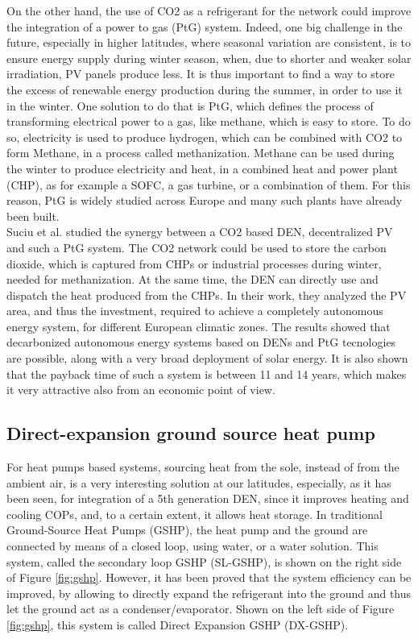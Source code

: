 \documentclass{article}
\begin{document}
On the other hand, the use of CO2 as a refrigerant for the network could improve the integration of a power to gas (PtG) system. Indeed, one big challenge in the future, especially in higher latitudes, where seasonal variation are consistent, is to ensure energy supply during winter season, when, due to shorter and weaker solar irradiation, PV panels produce less. It is thus important to find a way to store the excess of renewable energy production during the summer, in order to use it in the winter.
One solution to do that is PtG, which defines the process of transforming electrical power to a gas, like methane, which is easy to store. To do so, electricity is used to produce hydrogen, which can be combined with CO2 to form Methane, in a process called methanization. Methane can be used during the winter to produce electricity and heat, in a combined heat and power plant (CHP), as for example a SOFC, a gas turbine, or a combination of them. For this reason, PtG is widely studied across Europe and many such plants have already been built.\\ 
Suciu et al. \cite{suciuEnergyIntegrationCO22018} studied the synergy between a CO2 based DEN, decentralized PV and such a PtG system. The CO2 network could be used to store the carbon dioxide, which is captured from CHPs or industrial processes during winter, needed for methanization. At the same time, the DEN can directly use and dispatch the heat produced from the CHPs. In their work, they analyzed the PV area, and thus the investment, required to achieve a completely autonomous energy system, for different European climatic zones. The results showed that decarbonized autonomous energy systems based on DENs and PtG tecnologies are possible, along with a very broad deployment of solar energy. It is also shown that the payback time of such a system is between 11 and 14 years, which makes it very attractive also from an economic point of view.

\subsection{Direct-expansion ground source heat pump}\label{ss:dx}

For heat pumps based systems, sourcing heat from the sole, instead of from the ambient air, is a very interesting solution at our latitudes, especially, as it has been seen, for integration of a 5th generation DEN, since it improves heating and cooling COPs, and, to a certain extent, it allows heat storage. In traditional Ground-Source Heat Pumps (GSHP), the heat pump and the ground are connected by means of a closed loop, using water, or a water solution. This system, called the secondary loop GSHP (SL-GSHP), is shown on the right side of Figure \ref{fig:gshp}. However, it has been proved \cite{kruseStatusDevelopmentResearch, guoTechnoeconomicComparisonDirect2012} that the system efficiency can be improved, by allowing to directly expand the refrigerant into the ground and thus let the ground act as a condenser/evaporator. Shown on the left side of Figure \ref{fig:gshp}, this system is called Direct Expansion GSHP (DX-GSHP). 
\end{document}
